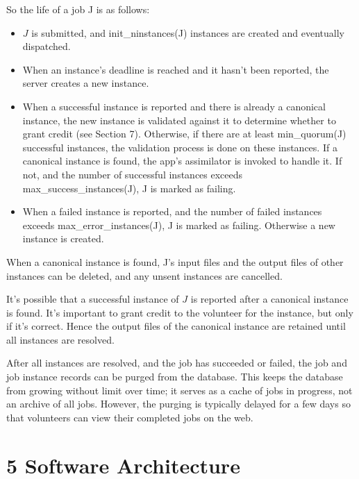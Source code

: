 \documentclass[
]{article}
\providecommand{\tightlist}{%
  \setlength{\itemsep}{0pt}\setlength{\parskip}{0pt}}
\begin{document}
So the life of a job J is as follows:

\begin{itemize}
\tightlist
\item
  \(J\) is submitted, and init\_ninstances(J) instances are created and
  eventually dispatched.\\
\item
  When an instance's deadline is reached and it hasn't been reported,
  the server creates a new instance.\\
\item
  When a successful instance is reported and there is already a
  canonical instance, the new instance is validated against it to
  determine whether to grant credit (see Section 7). Otherwise, if there
  are at least min\_quorum(J) successful instances, the validation
  process is done on these instances. If a canonical instance is found,
  the app's assimilator is invoked to handle it. If not, and the number
  of successful instances exceeds max\_success\_instances(J), J is
  marked as failing.\\
\item
  When a failed instance is reported, and the number of failed instances
  exceeds max\_error\_instances(J), J is marked as failing. Otherwise a
  new instance is created.
\end{itemize}

When a canonical instance is found, J's input files and the output files
of other instances can be deleted, and any unsent instances are
cancelled.

It's possible that a successful instance of \(J\) is reported after a
canonical instance is found. It's important to grant credit to the
volunteer for the instance, but only if it's correct. Hence the output
files of the canonical instance are retained until all instances are
resolved.

After all instances are resolved, and the job has succeeded or failed,
the job and job instance records can be purged from the database. This
keeps the database from growing without limit over time; it serves as a
cache of jobs in progress, not an archive of all jobs. However, the
purging is typically delayed for a few days so that volunteers can view
their completed jobs on the web.

\section{5 Software Architecture}\label{software-architecture}
\end{document}
